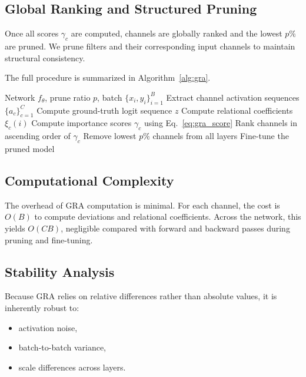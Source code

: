 \documentclass[sn-mathphys,Numbered]{sn-jnl}
\begin{document}
\subsection{Global Ranking and Structured Pruning}

Once all scores $\gamma_{c}$ are computed, channels are globally ranked and the lowest $p\%$ are pruned. We prune filters and their corresponding input channels to maintain structural consistency.

The full procedure is summarized in Algorithm~\ref{alg:gra}.

\begin{algorithm}[t]
\caption{GRA-CNN Structured Channel Pruning}
\label{alg:gra}
\begin{algorithmic}[1]
\Require Network $f_{\theta}$, prune ratio $p$, batch $\{x_i, y_i\}_{i=1}^{B}$
\State Extract channel activation sequences $\{a_c\}_{c=1}^{C}$
\State Compute ground-truth logit sequence $z$
\State Compute relational coefficients $\xi_c(i)$
\State Compute importance scores $\gamma_c$ using Eq.~\eqref{eq:gra_score}
\State Rank channels in ascending order of $\gamma_c$
\State Remove lowest $p\%$ channels from all layers
\State Fine-tune the pruned model
\end{algorithmic}
\end{algorithm}

\subsection{Computational Complexity}

The overhead of GRA computation is minimal. For each channel, the cost is $O(B)$ to compute deviations and relational coefficients. Across the network, this yields $O(CB)$, negligible compared with forward and backward passes during pruning and fine-tuning.

\subsection{Stability Analysis}

Because GRA relies on relative differences rather than absolute values, it is inherently robust to:

\begin{itemize}
    \item activation noise,  
    \item batch-to-batch variance,  
    \item scale differences across layers.
\end{itemize}
\end{document}
